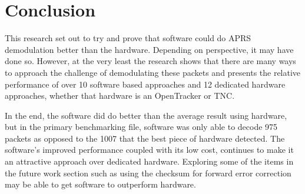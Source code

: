 \chapter{Conclusion}
This research set out to try and prove that software could do APRS demodulation better than the hardware. Depending on perspective, it may have done so. However, at the very least the research shows that there are many ways to approach the challenge of demodulating these packets and presents the relative performance of over 10 software based approaches and 12 dedicated hardware approaches, whether that hardware is an OpenTracker or TNC.

In the end, the software did do better than the average result using hardware, but in the primary benchmarking file, software was only able to decode 975 packets as opposed to the 1007 that the best piece of hardware detected. The software's improved performance coupled with its low cost, continues to make it an attractive approach over dedicated hardware. Exploring some of the items in the future work section such as using the checksum for forward error correction may be able to get software to outperform hardware.